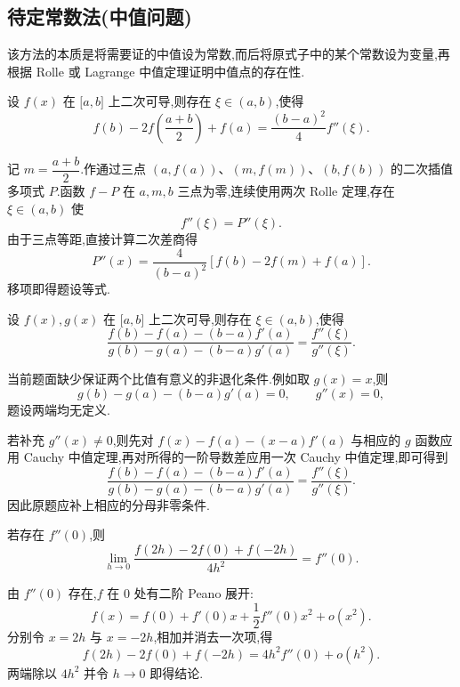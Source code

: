 \subsection{待定常数法(中值问题)}

该方法的本质是将需要证的中值设为常数,而后将原式子中的某个常数设为变量,再根据 Rolle 或 Lagrange 中值定理证明中值点的存在性.

\begin{example}
    设 $f(x)$ 在 $\lbrack a,b\rbrack$ 上二次可导,则存在 $\xi\in(a,b)$,使得
    \[
        f(b)-2f\left(\dfrac{a+b}{2}\right)+f(a)
        =\dfrac{(b-a)^2}{4}f''(\xi).
    \]
\end{example}
\exampleblank

\begin{solution}
    记 $m=\dfrac{a+b}{2}$.作通过三点 $(a,f(a))$、$(m,f(m))$、$(b,f(b))$ 的二次插值多项式 $P$.函数 $f-P$ 在 $a,m,b$ 三点为零,连续使用两次 Rolle 定理,存在 $\xi\in(a,b)$ 使
    \[
        f''(\xi)=P''(\xi).
    \]
    由于三点等距,直接计算二次差商得
    \[
        P''(x)=\dfrac{4}{(b-a)^2}
        \left[f(b)-2f(m)+f(a)\right].
    \]
    移项即得题设等式.
\end{solution}

\begin{example}
    设 $f(x),g(x)$ 在 $\lbrack a,b\rbrack$ 上二次可导,则存在 $\xi\in(a,b)$,使得
    \[
        \dfrac{f(b)-f(a)-(b-a)f'(a)}{g(b)-g(a)-(b-a)g'(a)}
        =\dfrac{f''(\xi)}{g''(\xi)}.
    \]
\end{example}
\exampleblank

\begin{solution}
    当前题面缺少保证两个比值有意义的非退化条件.例如取 $g(x)=x$,则
    \[
        g(b)-g(a)-(b-a)g'(a)=0,
        \qquad
        g''(x)=0,
    \]
    题设两端均无定义.

    若补充 $g''(x)\neq0$,则先对 $f(x)-f(a)-(x-a)f'(a)$ 与相应的 $g$ 函数应用 Cauchy 中值定理,再对所得的一阶导数差应用一次 Cauchy 中值定理,即可得到
    \[
        \dfrac{f(b)-f(a)-(b-a)f'(a)}
        {g(b)-g(a)-(b-a)g'(a)}
        =\dfrac{f''(\xi)}{g''(\xi)}.
    \]
    因此原题应补上相应的分母非零条件.
\end{solution}

\begin{example}
    若存在 $f''(0)$,则
    \[
        \lim\limits_{h\to0}
        \dfrac{f(2h)-2f(0)+f(-2h)}{4h^2}
        =f''(0).
    \]
\end{example}
\exampleblank

\begin{solution}
    由 $f''(0)$ 存在,$f$ 在 $0$ 处有二阶 Peano 展开:
    \[
        f(x)=f(0)+f'(0)x+\dfrac{1}{2}f''(0)x^2+o(x^2).
    \]
    分别令 $x=2h$ 与 $x=-2h$,相加并消去一次项,得
    \[
        f(2h)-2f(0)+f(-2h)=4h^2f''(0)+o(h^2).
    \]
    两端除以 $4h^2$ 并令 $h\to0$ 即得结论.
\end{solution}

